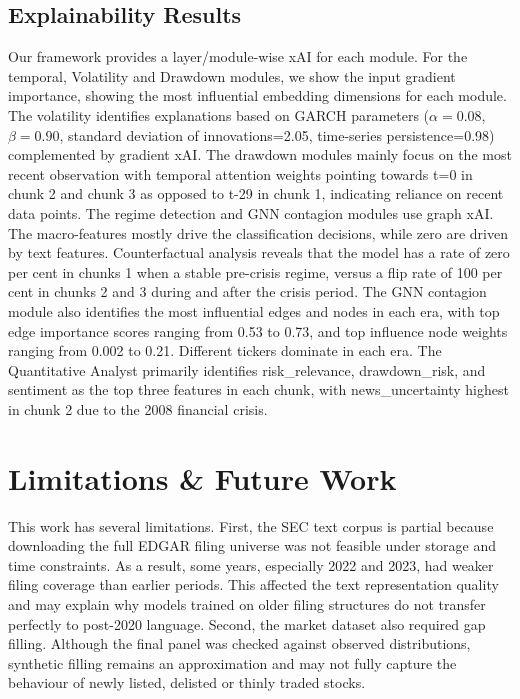 \documentclass[conference]{IEEEtran}
\begin{document}
\subsection{Explainability Results}
 Our framework provides a layer/module-wise xAI for each module. For the temporal, Volatility and Drawdown modules, we show the input gradient importance, showing the most influential embedding dimensions for each module. The volatility identifies explanations based on GARCH parameters  ($\alpha=0.08$, $\beta=0.90$, standard deviation of innovations=2.05, time-series persistence=0.98)  complemented by gradient xAI. The drawdown modules mainly focus on the most recent observation with temporal attention weights pointing towards t=0 in chunk 2 and chunk 3 as opposed to t-29 in chunk 1, indicating reliance on recent data points. The regime detection and GNN contagion modules use graph xAI. The macro-features mostly drive the classification decisions, while zero are driven by text features. Counterfactual analysis reveals that the model has a rate of zero per cent in chunks 1 when a stable pre-crisis regime, versus a flip rate of 100 per cent in chunks 2 and 3 during and after the crisis period. The GNN contagion module also identifies the most influential edges and nodes in each era, with top edge importance scores ranging from 0.53 to 0.73, and top influence node weights ranging from 0.002 to 0.21. Different tickers dominate in each era. The Quantitative Analyst primarily identifies risk\_relevance, drawdown\_risk, and sentiment as the top three features in each chunk, with news\_uncertainty highest in chunk 2 due to the 2008 financial crisis. 

\section{Limitations \& Future Work}

This work has several limitations. First, the SEC text corpus is partial because downloading the full EDGAR filing universe was not feasible under storage and time constraints. As a result, some years, especially 2022 and 2023, had weaker filing coverage than earlier periods. This affected the text representation quality and may explain why models trained on older filing structures do not transfer perfectly to post-2020 language. Second, the market dataset also required gap filling. Although the final panel was checked against observed distributions, synthetic filling remains an approximation and may not fully capture the behaviour of newly listed, delisted or thinly traded stocks.
\end{document}
